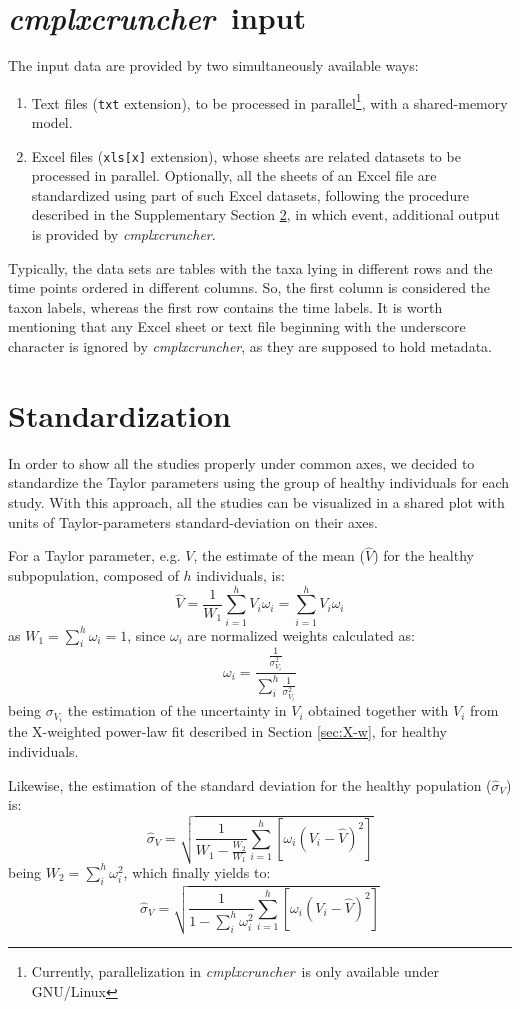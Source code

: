 \documentclass[12pt,oneside,letterpaper]{article}
\newcommand{\CC}[0]{\emph{cmplxcruncher}}
\begin{document}
\section{\CC\ input}
The input data are provided by two simultaneously available ways:
\begin{enumerate}
	\item Text files (\texttt{txt} extension), to be processed in parallel\footnote{Currently, parallelization in \CC\ is only available under GNU/Linux}, with a shared-memory model.
	\item Excel files (\texttt{xls[x]} extension), whose sheets are related datasets to be processed in parallel\footnotemark[\value{footnote}]. Optionally, all the sheets of an Excel file are standardized using part of such Excel datasets, following the procedure described in the Supplementary Section \ref{sec:stan}, in which event, additional output is provided by \CC.
\end{enumerate}
Typically, the data sets are tables with the taxa lying in different rows and the time points ordered in different columns. So, the first column is considered the taxon labels, whereas the first row contains the time labels. It is worth mentioning that any Excel sheet or text file beginning with the underscore character is ignored by \CC, as they are supposed to hold metadata.

\section{Standardization} \label{sec:stan}
In order to show all the studies properly under common axes, we decided to standardize the Taylor parameters using the group of healthy individuals for each study. With this approach, all the studies can be visualized in a shared plot with units of Taylor-parameters standard-deviation on their axes.

For a Taylor parameter, e.g. $V$, the estimate of the mean ($\widehat{V}$) for the healthy subpopulation, composed of $h$ individuals, is:
$$\widehat{V} = \frac{1}{W_1}\sum_{i=1}^h V_i \omega_i=\sum_{i=1}^h V_i \omega_i$$
as $W_1=\sum_i^h \omega_i=1$, since $\omega_i$ are normalized weights calculated as:
$$\omega_i = \frac{\frac{1}{\sigma^2_{V_i}}}{\sum_i^h\frac{1}{\sigma^2_{V_i}}}$$
being $\sigma_{V_i}$ the estimation of the uncertainty in $V_i$ obtained together with $V_i$ from the X-weighted power-law fit described in Section \ref{sec:X-w}, for healthy individuals.

Likewise, the estimation of the standard deviation for the healthy population ($\widehat{\sigma}_V$) is:
$$\widehat{\sigma}_V = \sqrt{\frac{1}{W_1-\frac{W_2}{W_1}}\sum_{i=1}^h\left[\omega_i\left(V_i-\hat{V}\right)^2\right]}$$
being $W_2=\sum_i^h \omega_i^2$, which finally yields to:
$$\widehat{\sigma}_V = \sqrt{\frac{1}{1-\sum_i^h \omega_i^2}\sum_{i=1}^h\left[\omega_i\left(V_i-\hat{V}\right)^2\right]}$$
\end{document}
